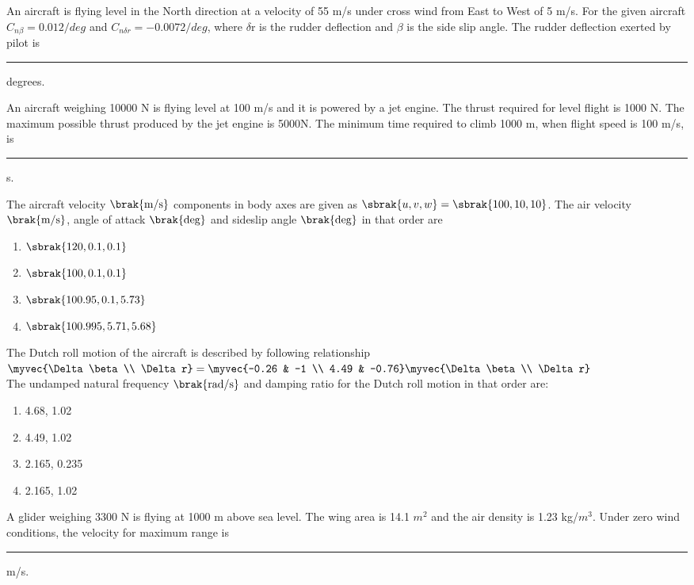 \item An aircraft is flying level in the North direction at a velocity of 55 m/s under cross wind from East to West of 5 m/s. For the given aircraft $C_{n\beta} = 0.012/deg$ and $C_{n\delta r} = -0.0072/deg$, where $\delta$r is the rudder deflection and $\beta$ is the side slip angle. The rudder deflection exerted by pilot is \rule{1cm}{0.4pt} degrees.
\item An aircraft weighing 10000 N is flying level at 100 m/s and it is powered by a jet engine. The thrust required for level flight is 1000 N. The maximum possible thrust produced by the jet engine is 5000N. The minimum time required to climb 1000 m, when flight speed is 100 m/s, is \rule{1cm}{0.4pt} s.
\item The aircraft velocity $\brak{\text{m/s}}$ components in body axes are given as $\sbrak{u, v, w} = \sbrak{100, 10, 10}$. The air velocity $\brak{\text{m/s}}$, angle of attack $\brak{\text{deg}}$ and sideslip angle $\brak{\text{deg}}$ in that order are
\begin{enumerate}
\item $\sbrak{120, 0.1, 0.1}$
\item $\sbrak{100, 0.1, 0.1}$
\item $\sbrak{100.95, 0.1, 5.73}$
\item $\sbrak{100.995, 5.71, 5.68}$
\end{enumerate}
\item The Dutch roll motion of the aircraft is described by following relationship \\
$\myvec{\Delta\beta \\
        \Delta r} = \myvec{-0.26 & -1 \\
	                   4.49 & -0.76}\myvec{\Delta\beta \\
			                       \Delta r}$ \\
The undamped natural frequency $\brak{\text{rad/s}}$ and damping ratio for the Dutch roll motion in that order are:
\begin{enumerate}
\item 4.68, 1.02
\item 4.49, 1.02
\item 2.165, 0.235
\item 2.165, 1.02
\end{enumerate}
\item A glider weighing 3300 N is flying at 1000 m above sea level. The wing area is 14.1 $m^2$ and the air density is 1.23 kg/$m^3$. Under zero wind conditions, the velocity for maximum range is \rule{1cm}{0.4pt} m/s.
